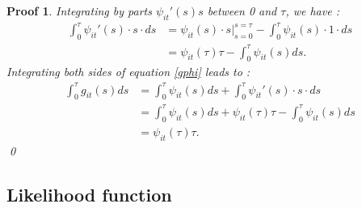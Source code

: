 \newtheorem*{proof2}{Proof}
\begin{proof2}
Integrating by parts $\psi_{it}'(s) s$ between 0 and $\tau$, we have :
\begin{align*}
    \int_0^{\tau}\psi_{it}'(s)\cdot s \cdot ds &= \psi_{it}(s) \cdot s|_{s=0}^{s=\tau} - \int_0^{\tau}\psi_{it}(s) \cdot 1 \cdot ds \\
    &= \psi_{it}(\tau) \tau - \int_0^{\tau}\psi_{it}(s) ds.
\end{align*}
Integrating both sides of equation \ref{gphi} leads to :
\begin{align*}
    \int_0^{\tau} g_{it}(s) ds &= \int_0^{\tau}\psi_{it}(s)ds + \int_0^{\tau}\psi_{it}'(s)\cdot s \cdot ds \\
    &= \int_0^{\tau}\psi_{it}(s)ds + \psi_{it}(\tau) \tau - \int_0^{\tau}\psi_{it}(s) ds \\
    &= \psi_{it}(\tau) \tau.
\end{align*} \qed
\end{proof2}

\subsection{Likelihood function}
\label{appendix1}


